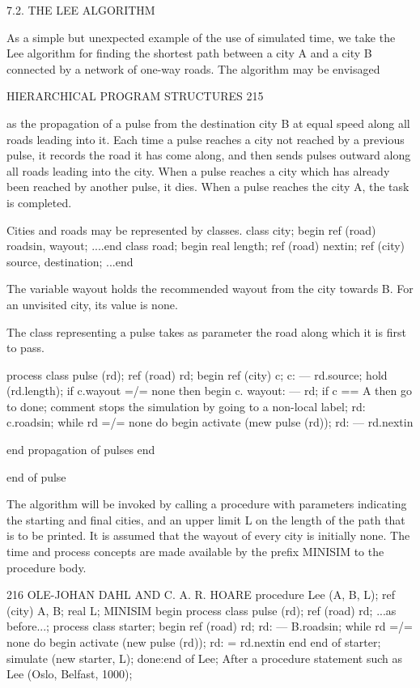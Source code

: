 {{{{{		7.2. THE LEE ALGORITHM
		
		As a simple but unexpected example of the use of simulated time, we take the Lee algorithm for finding the shortest path between a city A and a city B connected by a network of one-way roads. The algorithm may be envisaged
		
		HIERARCHICAL PROGRAM STRUCTURES 215
		
		as the propagation of a pulse from the destination city B at equal speed along all roads leading into it. Each time a pulse reaches a city not reached by a previous pulse, it records the road it has come along, and then sends pulses outward along all roads leading into the city. When a pulse reaches a city which has already been reached by another pulse, it dies. When a pulse reaches the city A, the task is completed.
		
		Cities and roads may be represented by classes. class city; begin ref (road) roadsin, wayout; ....end class road; begin real length; ref (road) nextin; ref (city) source, destination; ...end
		
		The variable wayout holds the recommended wayout from the city towards B. For an unvisited city, its value is none.
		
		The class representing a pulse takes as parameter the road along which it is first to pass.
		
		process class pulse (rd); ref (road) rd; begin ref (city) c; c: — rd.source; hold (rd.length); if c.wayout =/= none then begin c. wayout: — rd; if c == A then go to done; comment stops the simulation by going to a non-local label; rd: ~ c.roadsin; while rd =/= none do begin activate (mew pulse (rd)); rd: — rd.nextin
		
		end propagation of pulses end
		
		end of pulse
		
		The algorithm will be invoked by calling a procedure with parameters indicating the starting and final cities, and an upper limit L on the length of the path that is to be printed. It is assumed that the wayout of every city is initially none. The time and process concepts are made available by the prefix MINISIM to the procedure body.
		
		216 OLE-JOHAN DAHL AND C. A. R. HOARE procedure Lee (A, B, L); ref (city) A, B; real L; MINISIM begin process class pulse (rd); ref (road) rd; ...as before...; process class starter; begin ref (road) rd; rd: — B.roadsin; while rd =/= none do begin activate (new pulse (rd)); rd: = rd.nextin end end of starter; simulate (new starter, L); done:end of Lee; After a procedure statement such as Lee (Oslo, Belfast, 1000);
		
}}}}}
